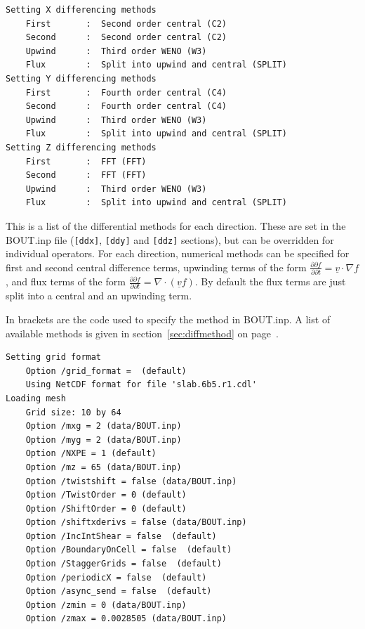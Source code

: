 \documentclass[12pt]{article}
\newcommand{\code}[1]{\texttt{#1}}
\newcommand{\deriv}[2]{\ensuremath{\frac{\partial #1}{\partial #2}}}
\begin{document}
\begin{verbatim}
Setting X differencing methods
	First       :  Second order central (C2)
	Second      :  Second order central (C2)
	Upwind      :  Third order WENO (W3)
	Flux        :  Split into upwind and central (SPLIT)
Setting Y differencing methods
	First       :  Fourth order central (C4)
	Second      :  Fourth order central (C4)
	Upwind      :  Third order WENO (W3)
	Flux        :  Split into upwind and central (SPLIT)
Setting Z differencing methods
	First       :  FFT (FFT)
	Second      :  FFT (FFT)
	Upwind      :  Third order WENO (W3)
	Flux        :  Split into upwind and central (SPLIT)
\end{verbatim}

This is a list of the differential methods for each direction. These are set in the 
BOUT.inp file (\code{[ddx]}, \code{[ddy]} and \code{[ddz]} sections), but can be overridden
for individual operators. For each direction, numerical methods can be specified for
first and second central difference terms, upwinding terms of the form
$\deriv{\partial f}{\partial t} = \underline{v}\cdot\nabla f$,
and flux terms of the form $\deriv{\partial f}{\partial t} = \nabla\cdot\left(\underline{v}f\right)$.
By default the flux terms are just split into a central and an upwinding term.

In brackets are the code used to specify the method in BOUT.inp. A list
of available methods is given in section~\ref{sec:diffmethod} on page~\pageref{sec:diffmethod}.

\begin{verbatim}
Setting grid format
	Option /grid_format =  (default)
	Using NetCDF format for file 'slab.6b5.r1.cdl'
Loading mesh
	Grid size: 10 by 64
	Option /mxg = 2 (data/BOUT.inp)
	Option /myg = 2 (data/BOUT.inp)
	Option /NXPE = 1 (default)
	Option /mz = 65 (data/BOUT.inp)
	Option /twistshift = false (data/BOUT.inp)
	Option /TwistOrder = 0 (default)
	Option /ShiftOrder = 0 (default)
	Option /shiftxderivs = false (data/BOUT.inp)
	Option /IncIntShear = false  (default)
	Option /BoundaryOnCell = false  (default)
	Option /StaggerGrids = false  (default)
	Option /periodicX = false  (default)
	Option /async_send = false  (default)
	Option /zmin = 0 (data/BOUT.inp)
	Option /zmax = 0.0028505 (data/BOUT.inp)
\end{verbatim}
\end{document}
